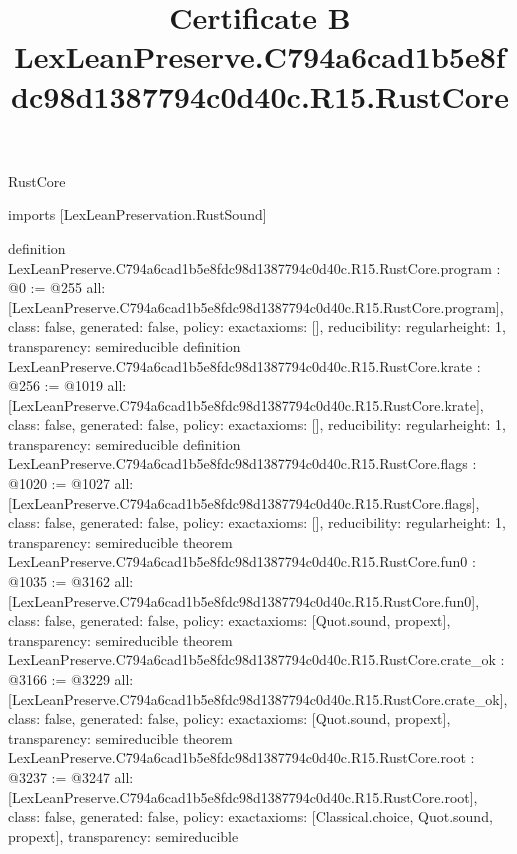 \begin{lexlean}{RustCore}
\title{Certificate B LexLeanPreserve.C794a6cad1b5e8fdc98d1387794c0d40c.R15.RustCore}
\begin{coremodule}
imports [LexLeanPreservation.RustSound]

definition LexLeanPreserve.C794a6cad1b5e8fdc98d1387794c0d40c.R15.RustCore.program : @0 := @255 {
  all: [LexLeanPreserve.C794a6cad1b5e8fdc98d1387794c0d40c.R15.RustCore.program],
  class: false,
  generated: false,
  policy: exact{axioms: []},
  reducibility: regular{height: 1},
  transparency: semireducible
}
definition LexLeanPreserve.C794a6cad1b5e8fdc98d1387794c0d40c.R15.RustCore.krate : @256 := @1019 {
  all: [LexLeanPreserve.C794a6cad1b5e8fdc98d1387794c0d40c.R15.RustCore.krate],
  class: false,
  generated: false,
  policy: exact{axioms: []},
  reducibility: regular{height: 1},
  transparency: semireducible
}
definition LexLeanPreserve.C794a6cad1b5e8fdc98d1387794c0d40c.R15.RustCore.flags : @1020 := @1027 {
  all: [LexLeanPreserve.C794a6cad1b5e8fdc98d1387794c0d40c.R15.RustCore.flags],
  class: false,
  generated: false,
  policy: exact{axioms: []},
  reducibility: regular{height: 1},
  transparency: semireducible
}
theorem LexLeanPreserve.C794a6cad1b5e8fdc98d1387794c0d40c.R15.RustCore.fun0 : @1035 := @3162 {
  all: [LexLeanPreserve.C794a6cad1b5e8fdc98d1387794c0d40c.R15.RustCore.fun0],
  class: false,
  generated: false,
  policy: exact{axioms: [Quot.sound, propext]},
  transparency: semireducible
}
theorem LexLeanPreserve.C794a6cad1b5e8fdc98d1387794c0d40c.R15.RustCore.crate_ok : @3166 := @3229 {
  all: [LexLeanPreserve.C794a6cad1b5e8fdc98d1387794c0d40c.R15.RustCore.crate_ok],
  class: false,
  generated: false,
  policy: exact{axioms: [Quot.sound, propext]},
  transparency: semireducible
}
theorem LexLeanPreserve.C794a6cad1b5e8fdc98d1387794c0d40c.R15.RustCore.root : @3237 := @3247 {
  all: [LexLeanPreserve.C794a6cad1b5e8fdc98d1387794c0d40c.R15.RustCore.root],
  class: false,
  generated: false,
  policy: exact{axioms: [Classical.choice, Quot.sound, propext]},
  transparency: semireducible
}


\end{coremodule}
\end{lexlean}

